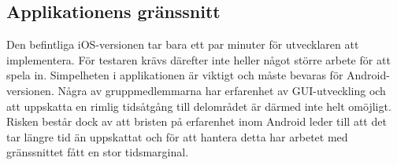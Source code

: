 \subsection{Applikationens gränssnitt}
Den befintliga iOS-versionen tar bara ett par minuter för utvecklaren att implementera. För testaren krävs därefter inte heller något större arbete för att spela in. Simpelheten i applikationen är viktigt och måste bevaras för Android-versionen. Några av gruppmedlemmarna har erfarenhet av GUI-utveckling och att uppskatta en rimlig tidsåtgång till delområdet är därmed inte helt omöjligt. Risken består dock av att bristen på erfarenhet inom Android leder till att det tar längre tid än uppskattat och för att hantera detta har arbetet med gränssnittet fått en stor tidsmarginal.